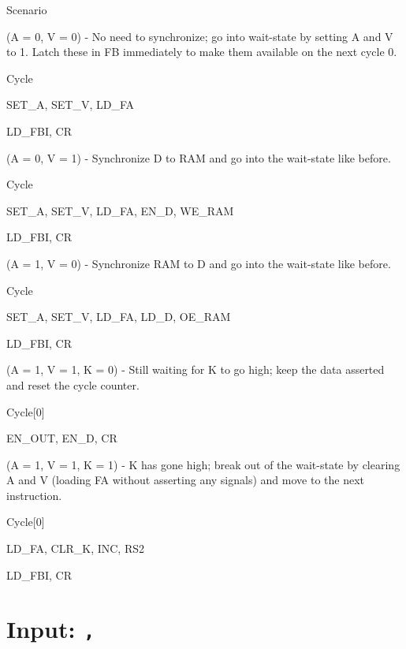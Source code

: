 \begin{labeledenum}{Scenario}
  \item (A = 0, V = 0) - No need to synchronize; go into wait-state by setting A and V to 1. Latch these in FB immediately to make them available on the next cycle 0.
    \begin{labeledenum}{Cycle}
    \item SET\_A, SET\_V, LD\_FA
    \item LD\_FBI, CR
    \end{labeledenum}

  \item (A = 0, V = 1) - Synchronize D to RAM and go into the wait-state like before.
    \begin{labeledenum}{Cycle}
    \item SET\_A, SET\_V, LD\_FA, EN\_D, WE\_RAM
    \item LD\_FBI, CR
    \end{labeledenum}

  \item (A = 1, V = 0) - Synchronize RAM to D and go into the wait-state like before.
    \begin{labeledenum}{Cycle}
    \item SET\_A, SET\_V, LD\_FA, LD\_D, OE\_RAM
    \item LD\_FBI, CR
    \end{labeledenum}

  \item (A = 1, V = 1, K = 0) - Still waiting for K to go high; keep the data asserted and reset the cycle counter.
    \begin{labeledenum}{Cycle}[0]
    \item EN\_OUT, EN\_D, CR
    \end{labeledenum}

  \item (A = 1, V = 1, K = 1) - K has gone high; break out of the wait-state by clearing A and V (loading FA without asserting any signals) and move to the next instruction.
    \begin{labeledenum}{Cycle}[0]
    \item LD\_FA, CLR\_K, INC, RS2
    \item LD\_FBI, CR
    \end{labeledenum}
\end{labeledenum}

\section{Input: \texttt{,}} \label{sec:sequences:input}
